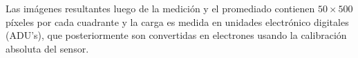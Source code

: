 

Las imágenes resultantes luego de la medición y el promediado contienen $50 \times 500$ píxeles por cada cuadrante y la carga es medida en unidades electrónico digitales (ADU's), que posteriormente son convertidas en electrones usando la calibración absoluta del sensor.